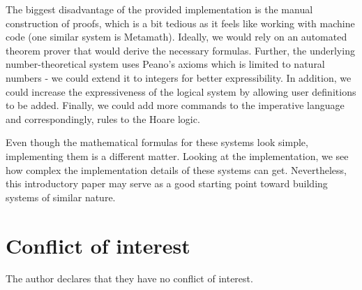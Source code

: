 \documentclass{article}
\begin{document}
The biggest disadvantage of the provided implementation is the manual construction of proofs, which is a bit tedious as it feels like working with machine code (one similar system is Metamath\cite{b9}). Ideally, we would rely on an automated theorem prover that would derive the necessary formulas. Further, the underlying number-theoretical system uses Peano's axioms which is limited to natural numbers - we could extend it to integers for better expressibility. In addition, we could increase the expressiveness of the logical system by allowing user definitions to be added. Finally, we could add more commands to the imperative language and correspondingly, rules to the Hoare logic.

Even though the mathematical formulas for these systems look simple, implementing them is a different matter. Looking at the implementation, we see how complex the implementation details of these systems can get. Nevertheless, this introductory paper may serve as a good starting point toward building systems of similar nature.

\section{Conflict of interest}

The author declares that they have no conflict of interest.
\end{document}
